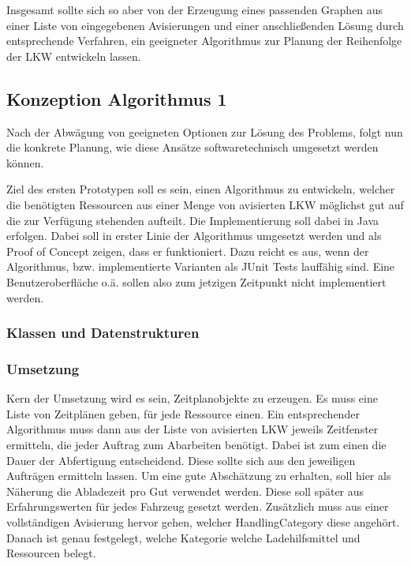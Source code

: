 Insgesamt sollte sich so aber von der Erzeugung eines passenden Graphen aus einer Liste von eingegebenen Avisierungen und einer anschließenden Lösung durch entsprechende Verfahren, ein geeigneter Algorithmus zur Planung der Reihenfolge der LKW entwickeln lassen.

\subsection{Konzeption Algorithmus 1}

Nach der Abwägung von geeigneten Optionen zur Lösung des Problems, folgt nun die konkrete Planung, wie diese Ansätze softwaretechnisch umgesetzt werden können.

Ziel des ersten Prototypen soll es sein, einen Algorithmus zu entwickeln, welcher die benötigten Ressourcen aus einer Menge von avisierten LKW möglichst gut auf die zur Verfügung stehenden aufteilt. Die Implementierung soll dabei in Java erfolgen. Dabei soll in erster Linie der Algorithmus umgesetzt werden und als Proof of Concept zeigen, dass er funktioniert. Dazu reicht es aus, wenn der Algorithmus, bzw. implementierte Varianten als JUnit Tests lauffähig sind. Eine Benutzeroberfläche o.ä. sollen also zum jetzigen Zeitpunkt nicht implementiert werden.

\subsubsection{Klassen und Datenstrukturen}

\subsubsection{Umsetzung} 

Kern der Umsetzung wird es sein, Zeitplanobjekte zu erzeugen. Es muss eine Liste von Zeitplänen geben, für jede Ressource einen. Ein entsprechender Algorithmus muss dann aus der Liste von avisierten LKW jeweils Zeitfenster ermitteln, die jeder Auftrag zum Abarbeiten benötigt. Dabei ist zum einen die Dauer der Abfertigung entscheidend. Diese sollte sich aus den jeweiligen Aufträgen ermitteln lassen. Um eine gute Abschätzung zu erhalten, soll hier als Näherung die Abladezeit pro Gut verwendet werden. Diese soll später aus Erfahrungswerten für jedes Fahrzeug gesetzt werden. Zusätzlich muss aus einer vollständigen Avisierung hervor gehen, welcher HandlingCategory diese angehört. Danach ist genau festgelegt, welche Kategorie welche Ladehilfsmittel und Ressourcen belegt.

